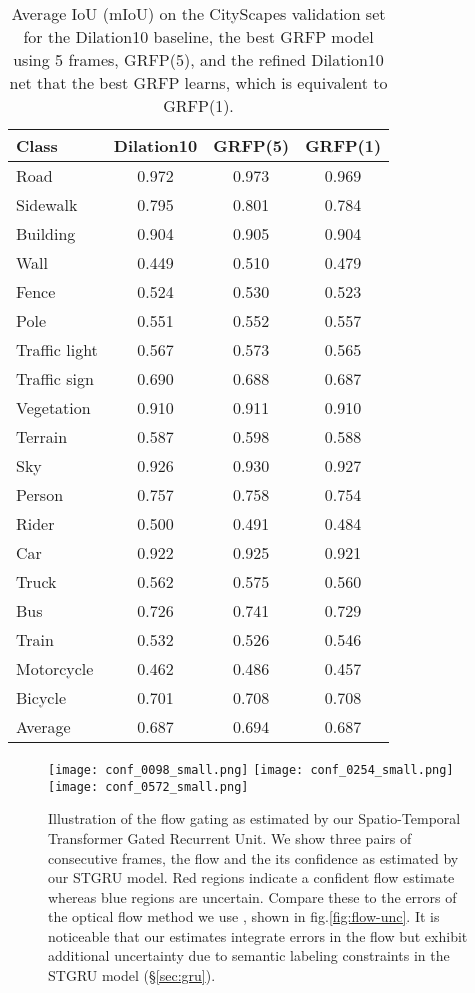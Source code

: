 \documentclass[10pt,twocolumn,letterpaper]{article}
\begin{document}
\begin{table}[!htbp]
\begin{center}
\small\begin{tabular}{|l||c|c|c|}
\hline
Class & Dilation10 & GRFP(5) & GRFP(1)\\
\hline
\hline
Road            & 0.972 & 0.973 & 0.969\\
Sidewalk        & 0.795 & 0.801 & 0.784\\
Building        & 0.904 & 0.905 & 0.904\\
Wall            & 0.449 & 0.510 & 0.479\\
Fence           & 0.524 & 0.530 & 0.523\\
Pole            & 0.551 & 0.552 & 0.557\\
Traffic light   & 0.567 & 0.573 & 0.565\\
Traffic sign    & 0.690 & 0.688 & 0.687\\
Vegetation      & 0.910 & 0.911 & 0.910\\
Terrain         & 0.587 & 0.598 & 0.588\\
Sky             & 0.926 & 0.930 & 0.927\\
Person          & 0.757 & 0.758 & 0.754\\
Rider           & 0.500 & 0.491 & 0.484\\
Car             & 0.922 & 0.925 & 0.921\\
Truck           & 0.562 & 0.575 & 0.560\\
Bus             & 0.726 & 0.741 & 0.729\\
Train           & 0.532 & 0.526 & 0.546\\
Motorcycle      & 0.462 & 0.486 & 0.457\\
Bicycle         & 0.701 & 0.708 & 0.708\\
\hline
Average         & 0.687 & 0.694 & 0.687 \\ \hline
\end{tabular}
\end{center}
\caption{Average IoU (mIoU) on the CityScapes validation set for the Dilation10 baseline, the best GRFP model using 5 frames, GRFP(5), and the refined Dilation10 net that the best GRFP learns, which is equivalent to GRFP(1).}
\label{detailed_scoreboard}
\end{table}

\begin{figure*}[!htbp]
\centering
\texttt{[image: conf\_0098\_small.png]}
\texttt{[image: conf\_0254\_small.png]}
\texttt{[image: conf\_0572\_small.png]}
\caption{Illustration of the flow gating as estimated by our Spatio-Temporal Transformer Gated Recurrent Unit. We show three pairs of consecutive frames, the flow and the its confidence as estimated by our STGRU model. Red regions indicate a confident flow estimate whereas blue regions are uncertain. Compare these to the errors of the optical flow method we use \cite{kroeger2016fast}, shown in fig.\ref{fig:flow-unc}. It is noticeable that our estimates integrate errors in the flow but exhibit additional uncertainty due to semantic labeling constraints in the STGRU model (\S\ref{sec:gru}).}
\label{flow_confidence}
\end{figure*}
\end{document}
